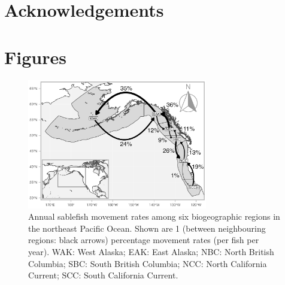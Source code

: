 \documentclass{article}
\begin{document}
\section{Acknowledgements}

\section{Figures}

\begin{figure}[htb]
    \centering
    \includegraphics[width = 0.7\textwidth]{map-regions-6-network}
    \caption{Annual sablefish movement rates among six biogeographic regions in the northeast Pacific Ocean. Shown are 1\degree{} (between neighbouring regions: black arrows) percentage movement rates (per fish per year). WAK: West Alaska; EAK: East Alaska; NBC: North British Columbia; SBC: South British Columbia; NCC: North California Current; SCC: South California Current.}
    \label{fig:map-network-regions-6}
\end{figure}
\end{document}
